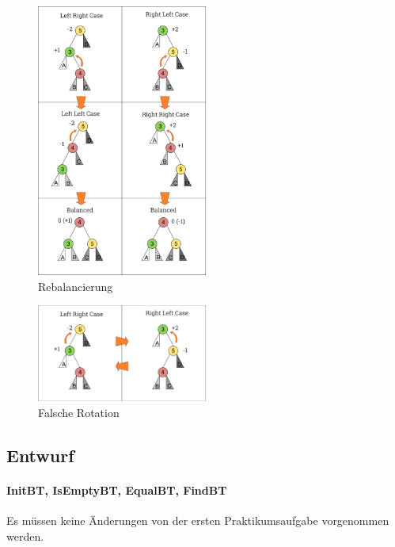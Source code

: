 \begin{figure}
    \centering
    \includegraphics[width= 0.5\textwidth]{img/AVL_Tree_Rebalancing}
    \caption{Rebalancierung}
    \label{fig:AVL-Cases}
\end{figure}
\begin{figure}
    \centering
    \includegraphics[width= 0.5\textwidth]{img/AVL_Tree_Rebalancing_wrong.pdf}
    \caption{Falsche Rotation}
    \label{fig:AVL-wrong-rotate}
\end{figure}

\subsection{Entwurf}\label{subsec:entwurf2}

\paragraph{InitBT, IsEmptyBT, EqualBT, FindBT}
Es müssen keine Änderungen von der ersten Praktikumsaufgabe vorgenommen werden.

